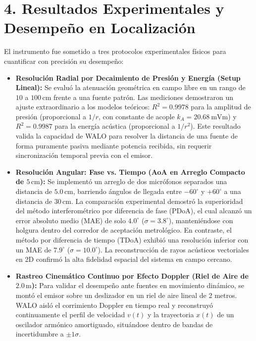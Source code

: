 \documentclass[10.5pt,letterpaper]{article}
\begin{document}
\section*{4. Resultados Experimentales y Desempeño en Localización}
El instrumento fue sometido a tres protocolos experimentales físicos para cuantificar con precisión su desempeño:
\begin{itemize}
    \item \textbf{Resolución Radial por Decaimiento de Presión y Energía (Setup Lineal):} Se evaluó la atenuación geométrica en campo libre en un rango de $10$ a $100\,\text{cm}$ frente a una fuente patrón. Las mediciones demostraron un ajuste extraordinario a los modelos teóricos: $R^2 = 0.9978$ para la amplitud de presión (proporcional a $1/r$, con constante de acople $k_A = \SI{20.68}{\milli\volt\metre}$) y $R^2 = 0.9987$ para la energía acústica (proporcional a $1/r^2$). Este resultado valida la capacidad de WALO para resolver la distancia de una fuente de forma puramente pasiva mediante potencia recibida, sin requerir sincronización temporal previa con el emisor.
    \item \textbf{Resolución Angular: Fase vs. Tiempo (AoA en Arreglo Compacto de $5\,\text{cm}$):} Se implementó un arreglo de dos micrófonos separados una distancia de $5.0\,\text{cm}$, barriendo ángulos de llegada entre $-60^\circ$ y $+60^\circ$ a una distancia de $30\,\text{cm}$. La comparación experimental demostró la superioridad del método interferométrico por diferencia de fase (PDoA), el cual alcanzó un error absoluto medio (MAE) de solo $4.0^\circ$ ($\sigma = 3.8^\circ$), manteniéndose con holgura dentro del corredor de aceptación metrológico. En contraste, el método por diferencia de tiempo (TDoA) exhibió una resolución inferior con un MAE de $7.9^\circ$ ($\sigma = 10.0^\circ$). La reconstrucción de rayos acústicos vectoriales en 2D confirmó la alta fidelidad espacial del sistema en campo cercano.
    \item \textbf{Rastreo Cinemático Continuo por Efecto Doppler (Riel de Aire de $2.0\,\text{m}$):} Para validar el desempeño ante fuentes en movimiento dinámico, se montó el emisor sobre un deslizador en un riel de aire lineal de 2 metros. WALO aisló el corrimiento Doppler en tiempo real y reconstruyó continuamente el perfil de velocidad $v(t)$ y la trayectoria $x(t)$ de un oscilador armónico amortiguado, situándose dentro de bandas de incertidumbre a $\pm 1\sigma$. 
\end{itemize}

\end{document}
